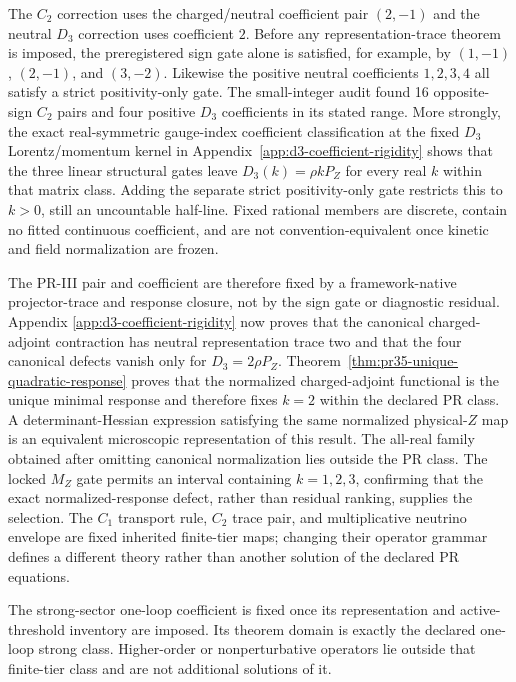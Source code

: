 The $C_2$ correction uses the charged/neutral coefficient pair $(2,-1)$ and the neutral $D_3$ correction uses coefficient $2$.  Before any representation-trace theorem is imposed, the preregistered sign gate alone is satisfied, for example, by $(1,-1)$, $(2,-1)$, and $(3,-2)$.  Likewise the positive neutral coefficients $1,2,3,4$ all satisfy a strict positivity-only gate.
The small-integer audit found 16 opposite-sign $C_2$ pairs and four positive $D_3$ coefficients in its stated range.  More strongly, the exact real-symmetric gauge-index coefficient classification at the fixed $D_3$ Lorentz/momentum kernel in Appendix~\ref{app:d3-coefficient-rigidity} shows that the three linear structural gates leave $D_3(k)=\rho kP_Z$ for every real $k$ within that matrix class.  Adding the separate strict positivity-only gate restricts this to $k>0$, still an uncountable half-line.  Fixed rational members are discrete, contain no fitted continuous coefficient, and are not
convention-equivalent once kinetic and field normalization are frozen.

The PR-III pair and coefficient are therefore fixed by a framework-native projector-trace and response closure, not by the sign gate or diagnostic residual.  Appendix \ref{app:d3-coefficient-rigidity} now proves that the canonical charged-adjoint contraction has neutral representation trace two and that the four canonical defects vanish only for $D_3=2\rho P_Z$. Theorem~\ref{thm:pr35-unique-quadratic-response} proves that the normalized charged-adjoint functional is the unique minimal response and therefore fixes $k=2$ within the declared PR class.  A determinant-Hessian expression satisfying the same normalized physical-$Z$ map is an equivalent microscopic representation of this result.  The all-real family obtained after omitting canonical normalization lies outside the PR class.  The locked $M_Z$ gate permits an interval containing $k=1,2,3$, confirming that the exact normalized-response defect, rather than residual ranking, supplies the selection.  The $C_1$ transport rule, $C_2$ trace pair, and multiplicative neutrino envelope are fixed inherited finite-tier maps; changing their operator grammar defines a different theory rather than another solution of the declared PR equations.

The strong-sector one-loop coefficient is fixed once its representation and active-threshold inventory are imposed.  Its theorem domain is exactly the declared one-loop strong class.  Higher-order or nonperturbative operators lie outside that finite-tier class and are not additional solutions of it.
